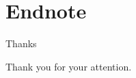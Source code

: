 \documentclass{beamer}
\begin{document}
\section{Endnote}

\begin{frame}{Thanks}
	\begin{center}
	Thank you for your attention.
	\end{center}
\end{frame}
\end{document}
